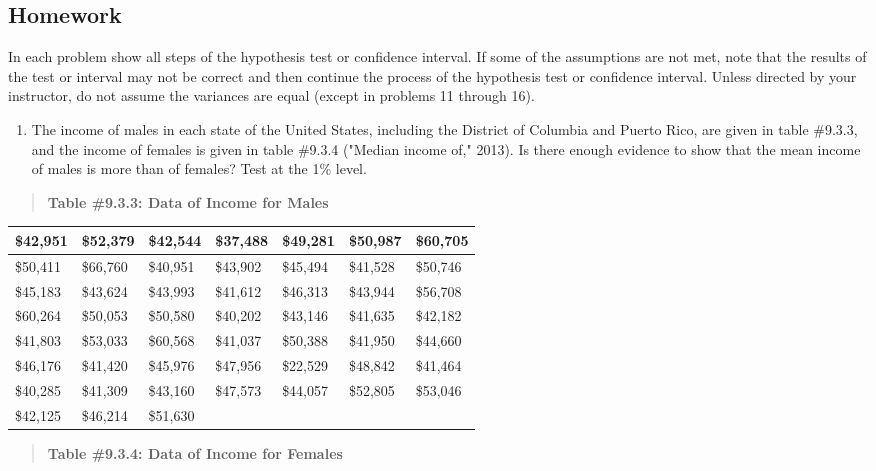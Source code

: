 \documentclass[]{book}
\providecommand{\tightlist}{%
  \setlength{\itemsep}{0pt}\setlength{\parskip}{0pt}}
\begin{document}
\hypertarget{homework-28}{%
\subsection{Homework}\label{homework-28}}

In each problem show all steps of the hypothesis test or confidence interval. If some of the assumptions are not met, note that the results of the test or interval may not be correct and then continue the process of the hypothesis test or confidence interval. Unless directed by your instructor, do not assume the variances are equal (except in problems 11 through 16).

\begin{enumerate}
\def\labelenumi{\arabic{enumi}.}
\tightlist
\item
  The income of males in each state of the United States, including the District of Columbia and Puerto Rico, are given in table \#9.3.3, and the income of females is given in table \#9.3.4 ("Median income of," 2013). Is there enough evidence to show that the mean income of males is more than of females? Test at the 1\% level.
\end{enumerate}

\begin{quote}
\textbf{Table \#9.3.3: Data of Income for Males}
\end{quote}

\begin{longtable}[]{@{}lllllll@{}}
\toprule
\$42,951 & \$52,379 & \$42,544 & \$37,488 & \$49,281 & \$50,987 & \$60,705\tabularnewline
\midrule
\endhead
\$50,411 & \$66,760 & \$40,951 & \$43,902 & \$45,494 & \$41,528 & \$50,746\tabularnewline
\$45,183 & \$43,624 & \$43,993 & \$41,612 & \$46,313 & \$43,944 & \$56,708\tabularnewline
\$60,264 & \$50,053 & \$50,580 & \$40,202 & \$43,146 & \$41,635 & \$42,182\tabularnewline
\$41,803 & \$53,033 & \$60,568 & \$41,037 & \$50,388 & \$41,950 & \$44,660\tabularnewline
\$46,176 & \$41,420 & \$45,976 & \$47,956 & \$22,529 & \$48,842 & \$41,464\tabularnewline
\$40,285 & \$41,309 & \$43,160 & \$47,573 & \$44,057 & \$52,805 & \$53,046\tabularnewline
\$42,125 & \$46,214 & \$51,630 & & & &\tabularnewline
\bottomrule
\end{longtable}

\begin{quote}
\textbf{Table \#9.3.4: Data of Income for Females}
\end{quote}
\end{document}
